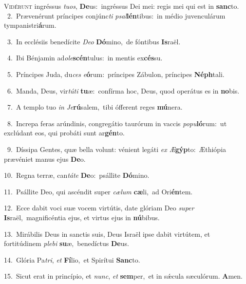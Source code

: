 \lettrine{\initial\textcolor{\initialcolor}{V}}{idérunt} ingréssus \textit{tu}\-\textit{os}, \textbf{De}\-us:~\star ingréssus Dei mei: regis mei qui est in \textbf{sanc}\-to.\\
{\numbfont\textcolor{\numbcolor}{~2.}}~Prævenérunt príncipes conjúnc\textit{ti} \textit{psal}\-\textbf{lén}tibus:~\star in médio juvenculárum tympanistri\-\textbf{á}\-rum.\par
{\numbfont\textcolor{\numbcolor}{~3.}}~In ecclésiis benedícite \textit{De}\-\textit{o} \textbf{Dó}\-mino,~\star de fóntibus \textbf{Is}\-raël.\par
{\numbfont\textcolor{\numbcolor}{~4.}}~Ibi Bénjamin ad\-\textit{o}\-\textit{le}\textbf{scén}tulus:~\star in mentis ex\-\textbf{cés}\-su.\par
{\numbfont\textcolor{\numbcolor}{~5.}}~Príncipes Juda, du\textit{ces} \textit{e}\-\textbf{ó}rum:~\star príncipes Zábulon, príncipes \textbf{Néph}\-tali.\par
{\numbfont\textcolor{\numbcolor}{~6.}}~Manda, Deus, vir\-\textit{tú}\-\textit{ti} \textbf{tu}\-æ:~\star confírma hoc, Deus, quod operátus es in \textbf{no}\-bis.\par
{\numbfont\textcolor{\numbcolor}{~7.}}~A templo tuo \textit{in} \textit{Je}\-\textbf{rú}salem,~\star tibi ófferent reges \textbf{mú}\-nera.\par
{\numbfont\textcolor{\numbcolor}{~8.}}~Increpa feras arúndinis, congregátio taurórum in vaccis \textit{po}\-\textit{pu}\textbf{ló}rum:~\star ut exclúdant eos, qui probáti sunt ar\-\textbf{gén}\-to.\par
{\numbfont\textcolor{\numbcolor}{~9.}}~Díssipa Gentes, quæ bella volunt: vénient legáti \textit{ex} \textit{Æ}\-\textbf{gýp}to:~\star Æthiópia prævéniet manus ejus \textbf{De}\-o.\par
{\numbfont\textcolor{\numbcolor}{10.}}~Regna terræ, can\-\textit{tá}\-\textit{te} \textbf{De}\-o:~\star psállite \textbf{Dó}\-mino.\par
{\numbfont\textcolor{\numbcolor}{11.}}~Psállite Deo, qui ascéndit super \textit{cæ}\-\textit{lum} \textbf{cæ}\-li,~\star ad Ori\-\textbf{én}\-tem.\par
{\numbfont\textcolor{\numbcolor}{12.}}~Ecce dabit voci suæ vocem virtútis, date glóriam Deo \textit{su}\-\textit{per} \textbf{Is}\-raël,~\star magnificéntia ejus, et virtus ejus in \textbf{nú}\-bibus.\par
{\numbfont\textcolor{\numbcolor}{13.}}~Mirábilis Deus in sanctis suis, Deus Israël ipse dabit virtútem, et fortitúdinem \textit{ple}\-\textit{bi} \textbf{su}\-æ,~\star benedíctus \textbf{De}\-us.\par
{\numbfont\textcolor{\numbcolor}{14.}}~Glória Pa\-\textit{tri}\-, \textit{et} \textbf{Fí}\-lio,~\star et Spirítui \textbf{Sanc}\-to.\par
{\numbfont\textcolor{\numbcolor}{15.}}~Sicut erat in princípio, et \textit{nunc}\-, \textit{et} \textbf{sem}\-per,~\star et in sǽcula sæculórum. \textbf{A}\-men.\par
